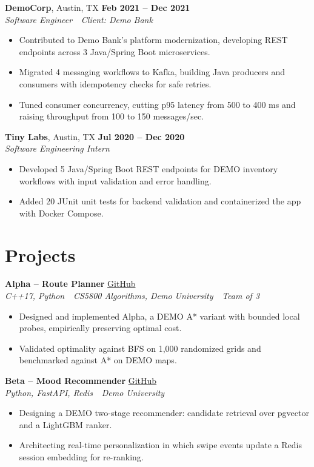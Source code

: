 \documentclass[letterpaper,10pt]{article}
\newcommand{\entry}[4]{%
  \textbf{#1}, #2 \hfill \textbf{#4}\\
  \textit{#3}\vspace{1pt}}
\newcommand{\project}[3]{%
  \textbf{#1} \hfill #2\\
  \textit{#3}\vspace{1pt}}
\newcommand{\entrygap}{\vspace{3pt}}
\begin{document}
\entrygap
\entry{DemoCorp}{Austin, TX}{Software Engineer \,\textbar\, Client: Demo Bank}{Feb 2021 -- Dec 2021}
\begin{itemize}
  \item Contributed to Demo Bank's platform modernization, developing REST endpoints across 3 Java/Spring Boot microservices.
  \item Migrated 4 messaging workflows to Kafka, building Java producers and consumers with idempotency checks for safe retries.
  \item Tuned consumer concurrency, cutting p95 latency from 500 to 400 ms and raising throughput from 100 to 150 messages/sec.
\end{itemize}

\entrygap
\entry{Tiny Labs}{Austin, TX}{Software Engineering Intern}{Jul 2020 -- Dec 2020}
\begin{itemize}
  \item Developed 5 Java/Spring Boot REST endpoints for DEMO inventory workflows with input validation and error handling.
  \item Added 20 JUnit unit tests for backend validation and containerized the app with Docker Compose.
\end{itemize}

\section{Projects}
\project{Alpha -- Route Planner}{\href{https://github.com/demo-candidate/alpha}{GitHub}}{C++17, Python \,\textbar\, CS5800 Algorithms, Demo University \,\textbar\, Team of 3}
\begin{itemize}
  \item Designed and implemented Alpha, a DEMO A* variant with bounded local probes, empirically preserving optimal cost.
  \item Validated optimality against BFS on 1,000 randomized grids and benchmarked against A* on DEMO maps.
\end{itemize}

\entrygap
\project{Beta -- Mood Recommender}{\href{https://github.com/demo-candidate/beta}{GitHub}}{Python, FastAPI, Redis \,\textbar\, Demo University}
\begin{itemize}
  \item Designing a DEMO two-stage recommender: candidate retrieval over pgvector and a LightGBM ranker.
  \item Architecting real-time personalization in which swipe events update a Redis session embedding for re-ranking.
\end{itemize}
\end{document}
